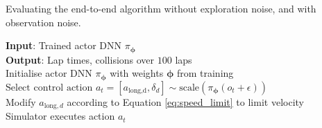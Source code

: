 \begin{algorithm}[htb!]
\caption{Evaluating the end-to-end algorithm without exploration noise, and with observation noise.}
\label{alg:end_to_end_deploy}
\nonl\textbf{Input}: Trained actor DNN $\pi_{\bm{\phi}}$ \\
\nonl\textbf{Output}: Lap times, collisions over $100$ laps \vspace{0.2cm}\\
Initialise actor DNN $\pi_{\bm{\phi}}$ with weights $\bm{\phi}$ from training \\
{
    {
        $\text{Select control action } a_t = [a_{\text{long,d}}, \delta_{d}] \sim \text{scale}(\pi_{\bm{\phi}}(o_t+\epsilon))$ \\
        {   
            Modify $a_{\text{long},d}$ according to Equation \ref{eq:speed_limit} to limit velocity \\
            Simulator executes action $a_t$ \\
        }
    }
}
\end{algorithm}